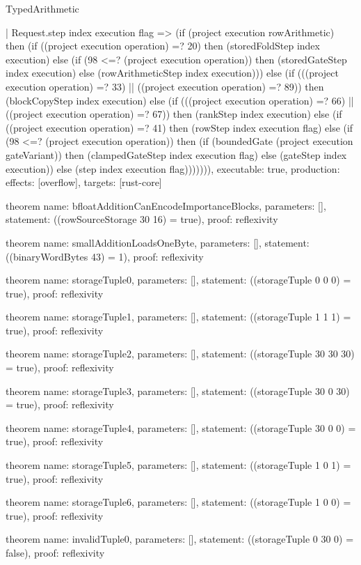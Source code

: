 \begin{lexlean}{TypedArithmetic}
\begin{semanticmodule}
{    | Request.step index execution flag => (if (project execution rowArithmetic) then (if ((project execution operation) =? 20) then (storedFoldStep index execution) else (if (98 <=? (project execution operation)) then (storedGateStep index execution) else (rowArithmeticStep index execution))) else (if (((project execution operation) =? 33) || ((project execution operation) =? 89)) then (blockCopyStep index execution) else (if (((project execution operation) =? 66) || ((project execution operation) =? 67)) then (rankStep index execution) else (if ((project execution operation) =? 41) then (rowStep index execution flag) else (if (98 <=? (project execution operation)) then (if (boundedGate (project execution gateVariant)) then (clampedGateStep index execution flag) else (gateStep index execution)) else (step index execution flag))))))),
  executable: true,
  production: {effects: [overflow], targets: [rust-core]}
}

theorem{
  name: bfloatAdditionCanEncodeImportanceBlocks,
  parameters: [],
  statement: ((rowSourceStorage 30 16) = true),
  proof: reflexivity{}
}

theorem{
  name: smallAdditionLoadsOneByte,
  parameters: [],
  statement: ((binaryWordBytes 43) = 1),
  proof: reflexivity{}
}

theorem{
  name: storageTuple0,
  parameters: [],
  statement: ((storageTuple 0 0 0) = true),
  proof: reflexivity{}
}

theorem{
  name: storageTuple1,
  parameters: [],
  statement: ((storageTuple 1 1 1) = true),
  proof: reflexivity{}
}

theorem{
  name: storageTuple2,
  parameters: [],
  statement: ((storageTuple 30 30 30) = true),
  proof: reflexivity{}
}

theorem{
  name: storageTuple3,
  parameters: [],
  statement: ((storageTuple 30 0 30) = true),
  proof: reflexivity{}
}

theorem{
  name: storageTuple4,
  parameters: [],
  statement: ((storageTuple 30 0 0) = true),
  proof: reflexivity{}
}

theorem{
  name: storageTuple5,
  parameters: [],
  statement: ((storageTuple 1 0 1) = true),
  proof: reflexivity{}
}

theorem{
  name: storageTuple6,
  parameters: [],
  statement: ((storageTuple 1 0 0) = true),
  proof: reflexivity{}
}

theorem{
  name: invalidTuple0,
  parameters: [],
  statement: ((storageTuple 0 30 0) = false),
  proof: reflexivity{}
}


\end{semanticmodule}
\end{lexlean}
